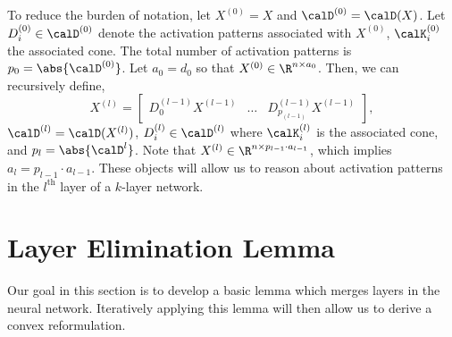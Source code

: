 \documentclass{article}
\newcommand{\Dl}{D^{(l)}}
\newcommand{\Dzero}{D^{(0)}}
\newcommand{\calDl}{\calD^{(l)}}
\newcommand{\calDzero}{\calD^{(0)}}
\newcommand{\calKl}{\calK^{(l)}}
\newcommand{\calKzero}{\calK^{(0)}}
\newcommand{\Xl}{X^{(l)}}
\newcommand{\Xzero}{X^{(0)}}
\begin{document}
To reduce the burden of notation, let \( \Xzero = X \) and \( \calDzero =
\calD(X) \).
Let \( \Dzero_i \in \calDzero \) denote the activation patterns associated
with \( \Xzero \), \( \calKzero_i \) the associated cone.
The total number of activation patterns is \( p_0 = \abs{\calDzero} \).
Let \( a_0 = d_0 \) so that \( \Xzero \in \R^{n \times a_0} \).
Then, we can recursively define,
\begin{equation}
    \Xl =
    \begin{bmatrix}
        D_0^{(l-1)} X^{(l-1)} & \ldots & D^{(l-1)}_{p_{(l-1)}} X^{(l-1)}
    \end{bmatrix}
    ,
\end{equation}
\( \calDl = \calD(\Xl) \), \( \Dl_i \in \calDl \) where \(
\calKl_i \) is the associated cone, and \( p_l = \abs{\calD^l} \).
Note that \( \Xl \in \R^{n \times p_{l-1} \cdot a_{l-1}} \), which implies \(
a_l = p_{l-1} \cdot a_{l-1} \).
These objects will allow us to reason about activation patterns in the \(
l^{\text{th}} \) layer of a \( k \)-layer network.

\section{Layer Elimination Lemma}

Our goal in this section is to develop a basic lemma which merges layers in
the neural network.
Iteratively applying this lemma will then allow us to derive a convex
reformulation.
\end{document}
